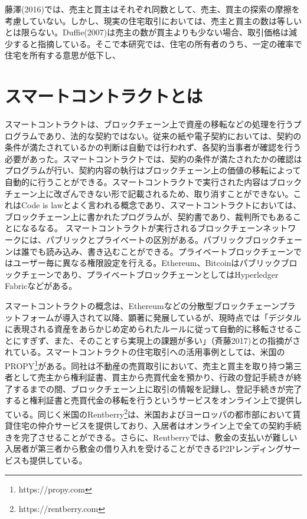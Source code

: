 \documentclass[a4paper,fontsize=11pt,report,notitlepage,line_length=38zw,number_of_lines=40]{jlreq}
\begin{document}
藤澤(2016)では、売主と買主はそれぞれ同数として、売主、買主の探索の摩擦を考慮していない。しかし、現実の住宅取引においては、売主と買主の数は等しいとは限らない。Duffie(2007)は売主の数が買主よりも少ない場合、取引価格は減少すると指摘している。そこで本研究では、住宅の所有者のうち、一定の確率で住宅を所有する意思が低下し、

\chapter{スマートコントラクトとは}
スマートコントラクトは、ブロックチェーン上で資産の移転などの処理を行うプログラムであり、法的な契約ではない。従来の紙や電子契約においては、契約の条件が満たされているかの判断は自動では行われず、各契約当事者が確認を行う必要があった。スマートコントラクトでは、契約の条件が満たされたかの確認はプログラムが行い、契約内容の執行はブロックチェーン上の価値の移転によって自動的に行うことができる。スマートコントラクトで実行された内容はブロックチェーン上に改ざんできない形で記載されるため、取り消すことができない。これはCode is lawとよく言われる概念であり、スマートコントラクトにおいては、ブロックチェーン上に書かれたプログラムが、契約書であり、裁判所でもあることになるなる\cite{nagasawa2013}。
スマートコントラクトが実行されるブロックチェーンネットワークには、パブリックとプライベートの区別がある。パブリックブロックチェーンは誰でも読み込み、書き込むことができる。プライベートブロックチェーンではユーザー毎に異なる権限設定を行える。Ethereum、Bitcoinはパブリックブロックチェーンであり、プライベートブロックチェーンとしてはHyperledger Fabricなどがある。

スマートコントラクトの概念は、Ethereumなどの分散型ブロックチェーンプラットフォームが導入されて以降、顕著に発展しているが、現時点では「デジタルに表現される資産をあらかじめ定められたルールに従って自動的に移転させることにすぎず、また、そのことすら実現上の課題が多い」（斉藤2017)\cite{saito2017}との指摘がされている。スマートコントラクトの住宅取引への活用事例としては、米国のPROPY\footnote{https://propy.com}がある。同社は不動産の売買取引において、売主と買主を取り持つ第三者として売主から権利証書、買主から売買代金を預かり、行政の登記手続きが終了するまでの間、ブロックチェーン上に取引の情報を記録し、登記手続きが完了すると権利証書と売買代金の移転を行うというサービスをオンライン上で提供している。同じく米国のRentberry\footnote{https://rentberry.com}は、米国およびヨーロッパの都市部において賃貸住宅の仲介サービスを提供しており、入居者はオンライン上で全ての契約手続きを完了させることができる。さらに、Rentberryでは、敷金の支払いが難しい入居者が第三者から敷金の借り入れを受けることができるP2Pレンディングサービスも提供している。
\end{document}
